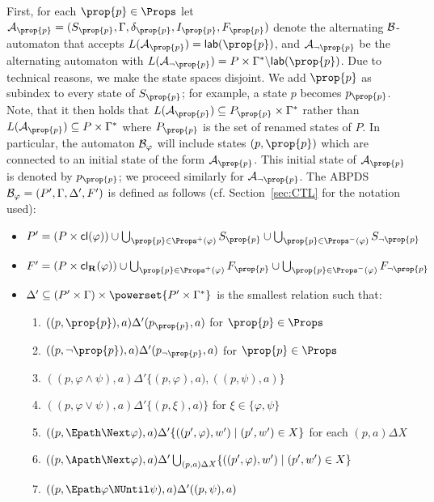\documentclass{llncs}
\begin{document}
{First, for each $\prop{p}\in\Props$ let $\AAut_{\prop{p}}=(S_\prop{p},\Gamma,\delta_\prop{p},I_\prop{p},F_\prop{p})$ denote the alternating $\mathcal{B}$-automaton that accepts $L(\AAut_\prop{p})=\lab(\prop{p})$, and $\AAut_{\neg \prop{p}}$ be the alternating automaton with $L(\AAut_{\neg \prop{p}})=P\times\Gamma^*\backslash \lab(\prop{p})$. Due to technical reasons, we make the state spaces disjoint. We add $\prop{p}$ as subindex to every state of $S_\prop{p}$; for example,  a state $p$ becomes $p_\prop{p}$.  Note, that it then holds that $L(\AAut_\prop{p})\subseteq P_\prop{p}\times \Gamma^*$ rather than $L(\AAut_\prop{p})\subseteq P\times \Gamma^*$ where $P_\prop{p}$ is the set of renamed states of $P$. In particular,  the automaton $\mathcal{B}_{\varphi}$ will include states $(p,\prop{p})$  which are connected to an initial state of the form  $\AAut_{\prop{p}}$. This initial state of $\AAut_\prop{p}$ is denoted by $p_{\prop{p}}$; we proceed similarly for $\AAut_{\neg\prop{p}}$. The ABPDS  $\mathcal{B}_{\varphi}=(P',\Gamma,\Delta',F')$ is defined as follows (cf. Section~\ref{sec:CTL} for the notation used):
\begin{itemize}
\item $P'=(P\times\cl(\varphi))\cup\bigcup_{\prop{p}\in\Props^+(\varphi)}S_{\prop{p}}\cup\bigcup_{\prop{p}\in\Props^-(\varphi)}S_{\neg\prop{p}}$
\item $F'=(P\times\cl_\Release(\varphi))\cup\bigcup_{\prop{p}\in\Props^+(\varphi)}F_{\prop{p}}\cup\bigcup_{\prop{p}\in\Props^-(\varphi)}F_{\neg\prop{p}}$
\item $\Delta'\subseteq (P'\times\Gamma)\times\powerset{P'\times\Gamma^*}$ is the smallest relation such that:
\begin{enumerate}
\item $((p,\prop{p}),a)\Delta'(p_\prop{p},a)$ for $\prop{p}\in\Props$ 
\item $((p,\neg\prop{p}),a)\Delta'(p_{\neg\prop{p}},a)$  for $\prop{p}\in\Props$ 
\item $((p,\varphi\wedge\psi),a)\Delta'\{(p,\varphi),a),((p,\psi),a)\}$
\item $((p,\varphi\vee\psi),a)\Delta'\{(p,\xi),a)\}$ for $\xi\in\{\varphi,\psi\}$
\item $((p,\Epath\Next\varphi),a)\Delta'\{((p',\varphi),w') \mid (p',w') \in X\}$ for each $(p,a)\Delta X$
\item $((p,\Apath\Next\varphi),a)\Delta'\bigcup_{(p,a)\Delta X}\{((p',\varphi),w') \mid (p',w') \in X\}$
\item $((p,\Epath\varphi\NUntil\psi),a) \Delta'((p,\psi),a)$

\end{enumerate}
\end{itemize}}
\end{document}

